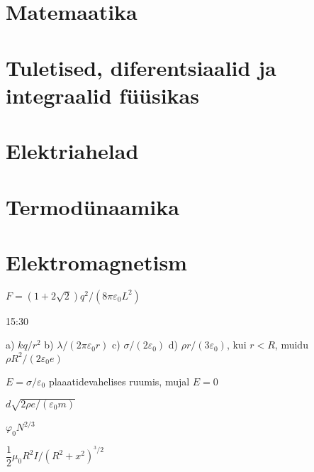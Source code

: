 \documentclass[a4paper,11pt,twocolumn]{article}
\begin{document}
\section{Matemaatika}
\section{Tuletised, diferentsiaalid ja integraalid füüsikas}
\section{Elektriahelad}
\section{Termodünaamika}
\section{Elektromagnetism}
\begin{solutions}
	\item \( F = (1 + 2\sqrt2)q^2/(8\pi\varepsilon_0 L^2) \)
	\item 15:30
	\item a) \( kq/r^2 \) b) \( \lambda/(2\pi\varepsilon_0 r) \) c) \( \sigma/(2\varepsilon_0) \) d) \( \rho r/(3\varepsilon_0) \), kui \( r<R \), muidu \( \rho R^2/(2\varepsilon_0 e) \)
	\item \( E=\sigma/\varepsilon_0 \) plaaatidevahelises ruumis, mujal \( E=0 \)
	\item \( d\sqrt{2\rho e/(\varepsilon_0 m)} \)
	\item \( \varphi_0 N^{2/3} \)
	\item
	\item
	\item
	\item \( \dfrac{1}{2}\mu_0 R^2 I/(R^2+x^2)^{^3/2} \)
\end{solutions}
\end{document}
